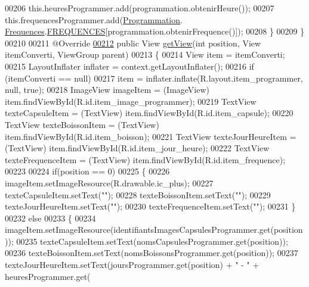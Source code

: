 \begin{DoxyCode}
00206                 this.heuresProgrammer.add(programmation.obtenirHeure());
00207                 this.frequencesProgrammer.add(\hyperlink{classcom_1_1example_1_1ekawa_1_1_programmation}{Programmation}.
      \hyperlink{classcom_1_1example_1_1ekawa_1_1_programmation_1_1_frequences}{Frequences}.\hyperlink{classcom_1_1example_1_1ekawa_1_1_programmation_1_1_frequences_afdc0109428ca2cc827cff55b8427cd50}{FREQUENCES}[programmation.obtenirFrequence()]);
00208             \}
00209         \}
00210 
00211         @Override
\hyperlink{classcom_1_1example_1_1ekawa_1_1_ihm_1_1_adaptateur_programmer_a948e7fa6ac9d148823e9f9dd3fba2f64}{00212}         \textcolor{keyword}{public} View \hyperlink{classcom_1_1example_1_1ekawa_1_1_ihm_1_1_adaptateur_programmer_a948e7fa6ac9d148823e9f9dd3fba2f64}{getView}(\textcolor{keywordtype}{int} position, View itemConverti, ViewGroup parent)
00213         \{
00214             View item = itemConverti;
00215             LayoutInflater inflater = context.getLayoutInflater();
00216             \textcolor{keywordflow}{if} (itemConverti == null)
00217                 item = inflater.inflate(R.layout.item\_programmer, null, \textcolor{keyword}{true});
00218             ImageView imageItem = (ImageView) item.findViewById(R.id.item\_image\_programmer);
00219             TextView texteCapsuleItem = (TextView) item.findViewById(R.id.item\_capsule);
00220             TextView texteBoissonItem = (TextView) item.findViewById(R.id.item\_boisson);
00221             TextView texteJourHeureItem = (TextView) item.findViewById(R.id.item\_jour\_heure);
00222             TextView texteFrequenceItem = (TextView) item.findViewById(R.id.item\_frequence);
00223 
00224             \textcolor{keywordflow}{if}(position == 0)
00225             \{
00226                 imageItem.setImageResource(R.drawable.ic\_plus);
00227                 texteCapsuleItem.setText(\textcolor{stringliteral}{""});
00228                 texteBoissonItem.setText(\textcolor{stringliteral}{""});
00229                 texteJourHeureItem.setText(\textcolor{stringliteral}{""});
00230                 texteFrequenceItem.setText(\textcolor{stringliteral}{""});
00231             \}
00232             \textcolor{keywordflow}{else}
00233             \{
00234                 imageItem.setImageResource(identifiantsImagesCapsulesProgrammer.get(position));
00235                 texteCapsuleItem.setText(nomsCapsulesProgrammer.get(position));
00236                 texteBoissonItem.setText(nomsBoissonsProgrammer.get(position));
00237                 texteJourHeureItem.setText(joursProgrammer.get(position) + \textcolor{stringliteral}{" - "} + heuresProgrammer.get(

\end{DoxyCode}
